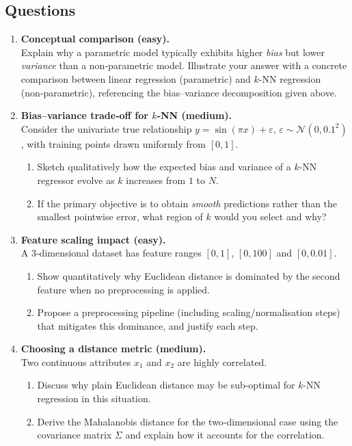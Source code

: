 \documentclass[12pt, a4paper]{article}
\begin{document}
\subsection{Questions}
\begin{enumerate}[label=\textbf{Q\arabic.}, leftmargin=, itemsep=12pt]

\item \textbf{Conceptual comparison (easy).}\\
Explain why a parametric model typically exhibits higher \emph{bias} but lower \emph{variance} than a non‑parametric model.  Illustrate your answer with a concrete comparison between linear regression (parametric) and \(k\)-NN regression (non‑parametric), referencing the bias–variance decomposition given above.

\item \textbf{Bias–variance trade‑off for \(k\)-NN (medium).}\\
Consider the univariate true relationship \(y = \sin(\pi x) + \varepsilon\), \(\varepsilon\sim\mathcal N(0,0.1^{2})\), with training points drawn uniformly from \([0,1]\).  
\begin{enumerate}[label=(\alph)]
\item Sketch qualitatively how the expected bias and variance of a \(k\)-NN regressor evolve as \(k\) increases from \(1\) to \(N\).  
\item If the primary objective is to obtain \emph{smooth} predictions rather than the smallest pointwise error, what region of \(k\) would you select and why?
\end{enumerate}

\item \textbf{Feature scaling impact (easy).}\\
A 3‑dimensional dataset has feature ranges \([0,1]\), \([0,100]\) and \([0,0.01]\).  
\begin{enumerate}[label=(\alph)]
\item Show quantitatively why Euclidean distance is dominated by the second feature when no preprocessing is applied.  
\item Propose a preprocessing pipeline (including scaling/normalisation steps) that mitigates this dominance, and justify each step.
\end{enumerate}

\item \textbf{Choosing a distance metric (medium).}\\
Two continuous attributes \(x_{1}\) and \(x_{2}\) are highly correlated.  
\begin{enumerate}[label=(\alph)]
\item Discuss why plain Euclidean distance may be sub‑optimal for \(k\)-NN regression in this situation.  
\item Derive the Mahalanobis distance for the two‑dimensional case using the covariance matrix \(\Sigma\) and explain how it accounts for the correlation.
\end{enumerate}


\end{enumerate}
\end{document}

